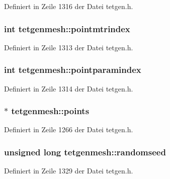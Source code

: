 Definiert in Zeile 1316 der Datei tetgen.\-h.

\hypertarget{classtetgenmesh_a35cfa4e4a0a5e8b1ef5dcded6b95f202}{
\subsubsection[{pointmtrindex}]{\setlength{\rightskip}{0pt plus 5cm}int tetgenmesh\-::pointmtrindex}}\label{classtetgenmesh_a35cfa4e4a0a5e8b1ef5dcded6b95f202}


Definiert in Zeile 1313 der Datei tetgen.\-h.

\hypertarget{classtetgenmesh_a6e119fd6f1234c3215f93b1443a554ce}{
\subsubsection[{pointparamindex}]{\setlength{\rightskip}{0pt plus 5cm}int tetgenmesh\-::pointparamindex}}\label{classtetgenmesh_a6e119fd6f1234c3215f93b1443a554ce}


Definiert in Zeile 1314 der Datei tetgen.\-h.

\hypertarget{classtetgenmesh_a419c24648d1c776238575e9f950b1124}{
\subsubsection[{points}]{ $\ast$ tetgenmesh\-::points}}\label{classtetgenmesh_a419c24648d1c776238575e9f950b1124}


Definiert in Zeile 1266 der Datei tetgen.\-h.

\hypertarget{classtetgenmesh_a7a81e8968d62ee9b09fb4b3df9acddd5}{
\subsubsection[{randomseed}]{\setlength{\rightskip}{0pt plus 5cm}unsigned long tetgenmesh\-::randomseed}}\label{classtetgenmesh_a7a81e8968d62ee9b09fb4b3df9acddd5}


Definiert in Zeile 1329 der Datei tetgen.\-h.

